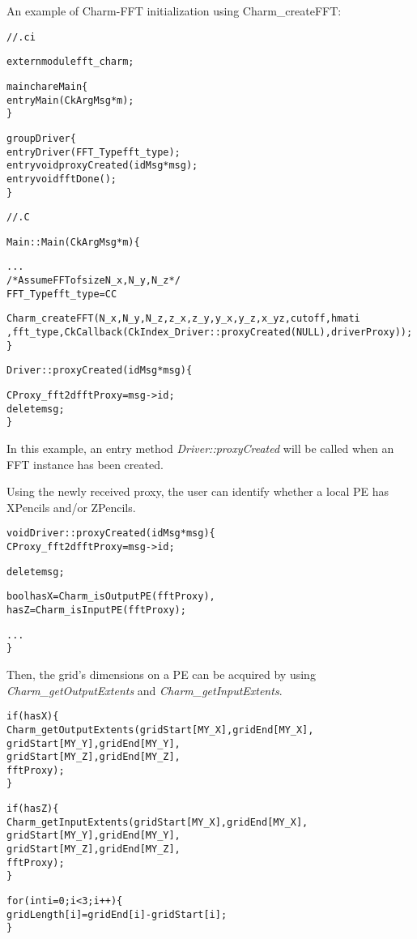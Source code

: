 An example of Charm-FFT initialization using Charm\_createFFT:
\begin{alltt}
// .ci

    extern module fft\_charm;

    mainchare Main \{
        entry Main(CkArgMsg *m);
    \}

    group Driver \{
        entry Driver(FFT\_Type fft\_type);
        entry void proxyCreated(idMsg *msg);
        entry void fftDone();
    \}

// .C

    Main::Main(CkArgMsg *m) \{

        ...
        /* Assume FFT of size N\_x, N\_y, N\_z */
        FFT\_Type fft\_type = CC

        Charm\_createFFT(N\_x, N\_y, N\_z, z\_x, z\_y, y\_x, y\_z, x\_yz, cutoff, hmati
, fft\_type, CkCallback(CkIndex\_Driver::proxyCreated(NULL), driverProxy));
    \}

    Driver::proxyCreated(idMsg *msg) \{

        CProxy\_fft2d fftProxy = msg-> id;
        delete msg;
    \}
\end{alltt}
In this example, an entry method \textit{Driver::proxyCreated} will be called
when an FFT instance has been created.

Using the newly received proxy, the user can identify whether a local PE has
XPencils and/or ZPencils.

\begin{alltt}
    void Driver::proxyCreated(idMsg *msg) \{
      CProxy\_fft2d fftProxy = msg->id;

      delete msg;

      bool hasX = Charm\_isOutputPE(fftProxy),
           hasZ = Charm\_isInputPE(fftProxy);

      ...
    \}
\end{alltt}

\noindent Then, the grid's dimensions on a PE can be acquired by using
\textit{Charm\_getOutputExtents} and \textit{Charm\_getInputExtents}.

\begin{alltt}
    if (hasX) \{
      Charm\_getOutputExtents(gridStart[MY\_X], gridEnd[MY\_X],
                            gridStart[MY\_Y], gridEnd[MY\_Y],
                            gridStart[MY\_Z], gridEnd[MY\_Z],
                            fftProxy);
    \}

    if (hasZ) \{
      Charm\_getInputExtents(gridStart[MY\_X], gridEnd[MY\_X],
                            gridStart[MY\_Y], gridEnd[MY\_Y],
                            gridStart[MY\_Z], gridEnd[MY\_Z],
                            fftProxy);
    \}

    for(int i = 0; i < 3; i++) \{
      gridLength[i] = gridEnd[i] - gridStart[i];
    \}
\end{alltt}

